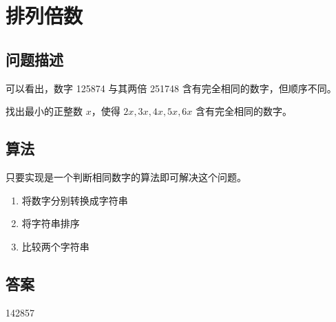 \section{排列倍数}
\subsection{问题描述}
\begin{tcolorbox}
	可以看出，数字 125874 与其两倍 251748 含有完全相同的数字，但顺序不同。

	找出最小的正整数 $x$，使得 $2x, 3x, 4x, 5x, 6x$ 含有完全相同的数字。
\end{tcolorbox}

\subsection{算法}
只要实现是一个判断相同数字的算法即可解决这个问题。

\begin{enumerate}
	\item 将数字分别转换成字符串
	\item 将字符串排序
	\item 比较两个字符串
\end{enumerate}

\subsection{答案}
142857
